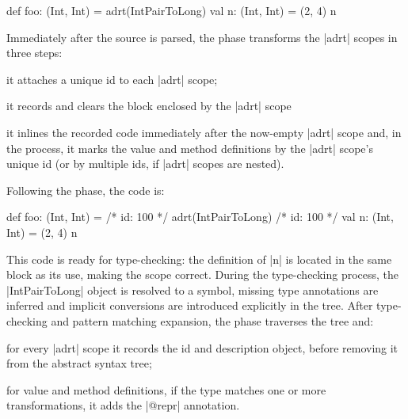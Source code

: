 \begin{lstlisting-nobreak}
def foo: (Int, Int) = {
  adrt(IntPairToLong) {
    val n: (Int, Int) = (2, 4)
  }
  n
}
\end{lstlisting-nobreak}

\noindent
Immediately after the source is parsed, the \postparser{} phase transforms the |adrt| scopes in three steps:

\vspace{0.3em}
\begin{compactitem}
\item it attaches a unique id to each |adrt| scope;
\item it records and clears the block enclosed by the |adrt| scope
\item it inlines the recorded code immediately after the now-empty
|adrt| scope and, in the process, it marks the value and method definitions
by the |adrt| scope's unique id (or by multiple ids, if |adrt| scopes are nested).
\end{compactitem}
\vspace{0.3em}

\noindent Following the \postparser{} phase, the code is:

\begin{lstlisting-nobreak}
def foo: (Int, Int) = {
  /* id: 100 */ adrt(IntPairToLong) {}
  /* id: 100 */ val n: (Int, Int) = (2, 4)
  n
}
\end{lstlisting-nobreak}

This code is ready for type-checking: the definition of |n| is located in the same block as its use, making the scope correct. During the type-checking process, the |IntPairToLong| object is resolved to a symbol, missing type annotations are inferred and implicit conversions are introduced explicitly in the tree. After type-checking and pattern matching expansion, the \inject{} phase traverses the tree and: %

\vspace{0.3em}
\begin{compactitem}
\item for every |adrt| scope it records the id and description object, before removing it from the abstract syntax tree;
\item for value and method definitions, if the type matches one or more transformations, it adds the |@repr| annotation.
\end{compactitem}
\vspace{0.3em}

